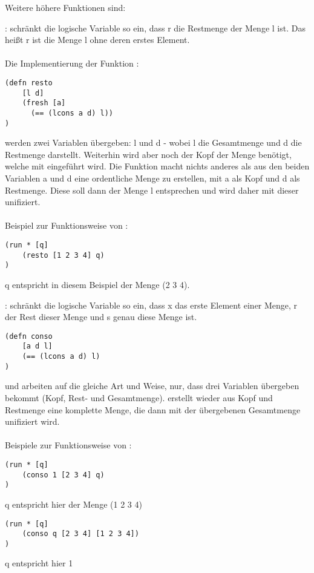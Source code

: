 Weitere höhere Funktionen sind:
\begin{description}
\item{:}
 schränkt die logische Variable so ein, dass r die Restmenge der Menge l ist. Das heißt r ist die Menge l ohne deren erstes Element.\\
\\
Die Implementierung der Funktion :
\begin{lstlisting}
(defn resto 
	[l d]
	(fresh [a]
	  (== (lcons a d) l))
)
\end{lstlisting}
 werden zwei Variablen übergeben: l und d - wobei l die Gesamtmenge und d die Restmenge darstellt. Weiterhin wird aber noch der Kopf der Menge benötigt, welche mit  eingeführt wird.
Die Funktion  macht nichts anderes als aus den beiden Variablen a und d eine ordentliche Menge zu erstellen, mit a als Kopf und d als Restmenge. Diese soll dann der Menge l entsprechen und wird daher mit dieser unifiziert.\\
\\
Beispiel zur Funktionsweise von :
\begin{lstlisting}
(run * [q]
	(resto [1 2 3 4] q)
)
\end{lstlisting}
q entspricht in diesem Beispiel der Menge (2 3 4).
\item{:}
 schränkt die logische Variable so ein, dass x das erste Element einer Menge, r der Rest dieser Menge und s genau diese Menge ist.
\begin{lstlisting}
(defn conso
	[a d l]
	(== (lcons a d) l)
)
\end{lstlisting}
 und  arbeiten auf die gleiche Art und Weise, nur, dass  drei Variablen übergeben bekommt (Kopf, Rest- und Gesamtmenge).  erstellt wieder aus Kopf und Restmenge eine komplette Menge, die dann mit der übergebenen Gesamtmenge unifiziert wird.\\
\\
Beispiele zur Funktionsweise von :
\begin{lstlisting}
(run * [q]
	(conso 1 [2 3 4] q)
)
\end{lstlisting}
q entspricht hier der Menge (1 2 3 4)

\begin{lstlisting}
(run * [q]
	(conso q [2 3 4] [1 2 3 4])
)
\end{lstlisting}
q entspricht hier 1
\end{description}
